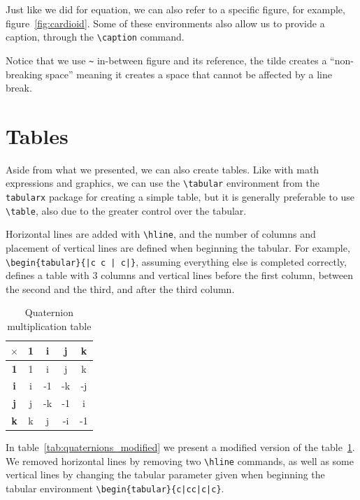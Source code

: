 \documentclass[10pt]{article}
\begin{document}
Just like we did for equation, we can also refer to a specific figure, for example, figure~\ref{fig:cardioid}. Some of these environments also allow us to provide a caption, through the \verb|\caption| command.

Notice that we use \verb|~| in-between figure and its reference, the tilde creates a ``non-breaking space'' meaning it creates a space that cannot be affected by a line break. 





\section{Tables}
\label{sec:tables}

Aside from what we presented, we can also create tables. Like with math expressions and graphics, we can use the \verb|\tabular| environment from the \verb|tabularx| package for creating a simple table, but it is generally preferable to use \verb|\table|, also due to the greater control over the tabular.

Horizontal lines are added with \verb|\hline|, and the number of columns and placement of vertical lines are defined when beginning the tabular. For example, \verb_\begin{tabular}{|c c | c|}_, assuming everything else is completed correctly, defines a table with $3$ columns and vertical lines before the first column, between the second and the third, and after the third column.

\begin{table}[h]
    \centering
    \begin{tabular}{|c|c|c|c|c|}
          \hline
         $\times$ & \textbf{1} & \textbf{i} & \textbf{j} & \textbf{k} \\
          \hline
        \textbf{1} & 1 & i & j & k \\
          \hline
        \textbf{i} & i & -1 & -k & -j \\
          \hline
        \textbf{j} & j & -k & -1 & i \\
          \hline
        \textbf{k} & k & j & -i & -1 \\
          \hline
    \end{tabular}
    \caption{Quaternion multiplication table}
    \label{tab:quaternions}
\end{table}

In table~\ref{tab:quaternions_modified} we present a modified version of the table~\ref{tab:quaternions}.
We removed horizontal lines by removing two \verb|\hline| commands, as well as some vertical lines by changing the tabular parameter given when beginning the tabular environment \verb_\begin{tabular}{c|cc|c|c}_. %
\end{document}
